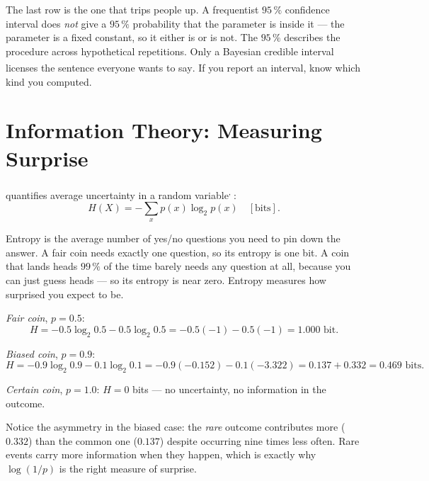 \begin{engineernote}
The last row is the one that trips people up. A frequentist $95\,\%$ confidence
interval does \emph{not} give a $95\,\%$ probability that the parameter is
inside it --- the parameter is a fixed constant, so it either is or is not. The
$95\,\%$ describes the procedure across hypothetical repetitions. Only a
Bayesian credible interval licenses the sentence everyone wants to
say\textsuperscript{\cite[][p.~9]{barberBayesianReasoningMachine2012}}. If you
report an interval, know which kind you computed.
\end{engineernote}

\section{Information Theory: Measuring Surprise}

 quantifies average uncertainty in a random
variable\textsuperscript{\cite{shannonMathematicalTheoryCommunication},
\cite{mackayInformationTheoryInference2005}}:
\begin{equation}
  H(X) = -\sum_x p(x)\log_2 p(x) \quad[\text{bits}].
  \label{eq:math-entropy}
\end{equation}

\begin{plainlanguage}
Entropy is the average number of yes/no questions you need to pin down the
answer. A fair coin needs exactly one question, so its entropy is one bit. A
coin that lands heads $99\,\%$ of the time barely needs any question at all,
because you can just guess heads --- so its entropy is near zero. Entropy
measures how surprised you expect to be.
\end{plainlanguage}

\begin{workedexample}
\emph{Fair coin}, $p = 0.5$:
\[
  H = -0.5\log_2 0.5 - 0.5\log_2 0.5 = -0.5(-1) - 0.5(-1) = 1.000 \text{ bit.}
\]

\emph{Biased coin}, $p = 0.9$:
\[
  H = -0.9\log_2 0.9 - 0.1\log_2 0.1
    = -0.9(-0.152) - 0.1(-3.322)
    = 0.137 + 0.332 = 0.469 \text{ bits.}
\]

\emph{Certain coin}, $p = 1.0$: $H = 0$ bits --- no uncertainty, no
information in the outcome.

Notice the asymmetry in the biased case: the \emph{rare} outcome contributes
more ($0.332$) than the common one ($0.137$) despite occurring nine times less
often. Rare events carry more information when they happen, which is exactly
why $\log(1/p)$ is the right measure of surprise.
\end{workedexample}

